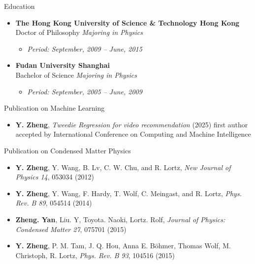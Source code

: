 \documentclass[a4paper,8pt,oneside]{scrartcl}
\newenvironment{ressection}[1]{
    \vspace{2pt}
    {\selectfont#1}
    \begin{itemize}
    \vspace{0pt}
}{
    \end{itemize}
}
\newcommand{\resitems}[1]{
    \vspace{-4pt}
    \item #1
}
\newcommand{\ressubitem}[1]{
    \vspace{0pt}
    \item #1
}
\newcommand{\resbigitem}[3]{
    \vspace{-5pt}
    \item
    \textbf{#1}\\
    #2
    \textit{#3}
}
\newenvironment{ressubsec}[3]{
    \resbigitem{#1}{#2}{#3}
    \vspace{-2pt}
    \begin{itemize}
}{
    \end{itemize}
}
\begin{document}
\begin{ressection}{Education}
    \begin{ressubsec}{The Hong Kong University of Science \& Technology \hfill Hong Kong}{Doctor of Philosophy}{Majoring in Physics}
        \ressubitem{\itshape Period: September, 2009 -- June, 2015}
    \end{ressubsec}
    \begin{ressubsec}{Fudan University \hfill Shanghai}{Bachelor of Science}{Majoring in Physics}
        \ressubitem{\itshape Period: September, 2005 -- June, 2009}
    \end{ressubsec}
\end{ressection}

\begin{ressection}{Publication on Machine Learning}
	\resitems{\textbf{Y. Zheng}, \emph{Tweedie Regression for video recommendation} (2025) first author accepted by International Conference on Computing and Machine Intelligence}
\end{ressection}

\begin{ressection}{Publication on Condensed Matter Physics}
	  \resitems{\textbf{Y. Zheng}, Y. Wang, B. Lv, C. W. Chu, and R. Lortz, \emph{New Journal of Physics 14}, 053034 (2012)}
	  \resitems{\textbf{Y. Zheng}, Y. Wang, F. Hardy, T. Wolf, C. Meingast, and R. Lortz, \emph{Phys. Rev. B 89}, 054514 (2014)}
	  \resitems{\textbf{Zheng. Yan}, Liu. Y, Toyota. Naoki, Lortz. Rolf, \emph{Journal of Physics: Condensed Matter 27}, 075701 (2015)}
	  \resitems{\textbf{Y. Zheng}, P. M. Tam, J. Q. Hou, Anna E. Böhmer, Thomas Wolf, M. Christoph, R. Lortz, \emph{Phys. Rev. B 93}, 104516 (2015)}
\end{ressection}


\end{document}
